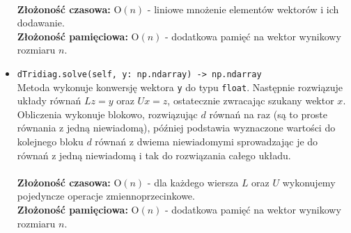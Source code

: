 \documentclass[12pt]{article}
\newcommand{\code}{\texttt}
\begin{document}
\begin{itemize}
\\
\textbf{Złożoność czasowa:} O$(n)$ - liniowe mnożenie elementów wektorów i ich dodawanie.\\
\textbf{Złożoność pamięciowa:} O$(n)$ - dodatkowa pamięć na wektor wynikowy rozmiaru $n$.
\vspace{5mm}
\item \code{dTridiag.solve(self, y: np.ndarray) -> np.ndarray}
\vspace{1mm}\\
Metoda wykonuje konwersję wektora \code{y} do typu \code{float}. Następnie rozwiązuje układy \mbox{równań} $Lz = y$ oraz $Ux = z$, ostatecznie zwracając szukany wektor $x$. Obliczenia \mbox{wykonuje} blokowo, rozwiązując $d$ równań na raz (są to proste równania z jedną niewiadomą), później podstawia wyznaczone wartości do kolejnego bloku $d$ równań z dwiema niewiadomymi sprowadzając je do równań z jedną niewiadomą i tak do rozwiązania całego układu.\\
\\
\textbf{Złożoność czasowa:} O$(n)$ - dla każdego wiersza $L$ oraz $U$ wykonujemy pojedyncze operacje zmiennoprzecinkowe.\\
\textbf{Złożoność pamięciowa:} O$(n)$ - dodatkowa pamięć na wektor wynikowy rozmiaru $n$.
\end{itemize}
\end{document}
